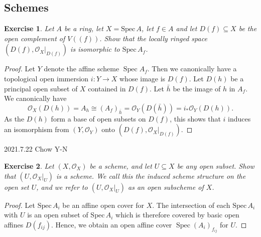 \documentclass[12pt]{amsart}
\newtheorem{exe}{Exercise}[subsection]
\begin{document}
\subsection{Schemes}
\begin{exe}
	Let $A$ be a ring, let $X= \mathrm{Spec}\, A$, let $f \in A$ and let $D(f) \subseteq X$ be the open complement of $V((f))$. Show that the locally ringed space $\left(D(f),\mathcal{O}_{X}|_{D(f)}\right)$ is isomorphic to $\mathrm{Spec}\, A_{f}$.
\end{exe}
\begin{proof}
	Let $Y$ denote the affine scheme $\operatorname{Spec} A_{f} .$ Then we canonically have a topological open immersion $i: Y \rightarrow X$ whose image is $D(f) .$ Let $D(h)$ be a principal open subset of $X$ contained in $D(f)$. Let $\bar{h}$ be the image of $h$ in $A_{f} .$ We canonically have $$\mathcal{O}_{X}(D(h))=A_{h} \cong\left(A_{f}\right)_{\bar{h}}=\mathcal{O}_{Y}(D(\bar{h}))=i_{*} \mathcal{O}_{Y}(D(h)) .$$ As the $D(h)$ form a base of open subsets on $D(f)$, this shows that $i$ induces an isomorphism from $\left(Y, \mathcal{O}_{Y}\right)$ onto $\left(D(f),\mathcal{O}_{X}|_{D(f)}\right)$.
\end{proof}

2021.7.22 Chow Y-N
\begin{exe}
	Let $\left(X, \mathcal{O}_{X}\right)$ be a scheme, and let $U \subseteq X$ be any open subset. Show that $\left(U,\left.\mathcal{O}_{X}\right|_{U}\right)$ is a scheme. We call this the \emph{induced scheme structure} on the open set $U$, and we refer to $(U,\mathcal{O}_X|_U)$ as an \emph{open subscheme} of $X$.
\end{exe}

\begin{proof}
	Let $\mathrm{Spec}\, A_{i}$ be an affine open cover for $X$. The intersection of each $\mathrm{Spec}\, A_{i}$ with $U$ is an open subset of $\mathrm{Spec}\, A_{i}$ which is therefore covered by basic open affines $D(f_{i j})$. Hence, we obtain an open affine cover $\operatorname{Spec}\left(A_{i}\right)_{f_{ij}}$ for $U$.
\end{proof}
\end{document}
